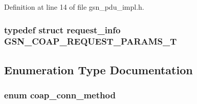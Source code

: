 Definition at line 14 of file gsn\_\-pdu\_\-impl.h.

\hypertarget{a00538_a8a243064c0dae8cfa5791f2ca3223eb9}{
\subsubsection[{GSN\_\-COAP\_\-REQUEST\_\-PARAMS\_\-T}]{\setlength{\rightskip}{0pt plus 5cm}typedef struct {\bf request\_\-info}  {\bf GSN\_\-COAP\_\-REQUEST\_\-PARAMS\_\-T}}}
\label{a00538_a8a243064c0dae8cfa5791f2ca3223eb9}


\subsection{Enumeration Type Documentation}
\hypertarget{a00538_a60b3db981099ef05a78fd3a008890d4a}{
\subsubsection[{coap\_\-conn\_\-method}]{\setlength{\rightskip}{0pt plus 5cm}enum {\bf coap\_\-conn\_\-method}}}
\label{a00538_a60b3db981099ef05a78fd3a008890d4a}
